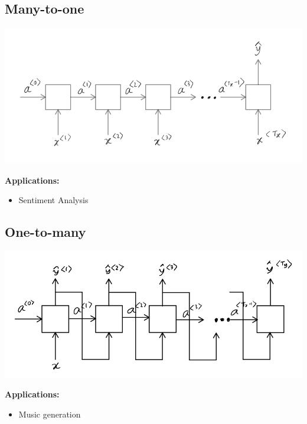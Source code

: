 \documentclass[a4paper,11pt]{article}
\renewcommand{\.}{\cdot}
\begin{document}
\subsection{Many-to-one}
\label{sec:org29e6ac6}
\begin{center}
\includegraphics[width=.9\linewidth]{./img/many-to-one.png}
\end{center}
\textbf{Applications:}
\begin{itemize}
\item Sentiment Analysis
\end{itemize}
\subsection{One-to-many}
\label{sec:org3325850}
\begin{center}
\includegraphics[width=.9\linewidth]{./img/one-to-many.png}
\end{center}
\textbf{Applications:}
\begin{itemize}
\item Music generation
\end{itemize}
\end{document}
